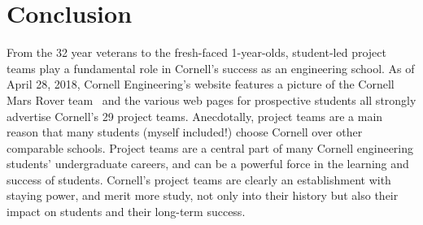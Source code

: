 \documentclass[12pt]{article}
\begin{document}
\section{Conclusion}
\label{sec:conclusion}

From the 32 year veterans to the fresh-faced 1-year-olds, student-led project teams play a fundamental role in Cornell's success as an engineering school.
As of April 28, 2018, Cornell Engineering's website features a picture of the Cornell Mars Rover team~\cite{fleischman_rovers_2018} and the various web pages for prospective students all strongly advertise Cornell's 29 project teams.
Anecdotally, project teams are a main reason that many students (myself included!) choose Cornell over other comparable schools.
Project teams are a central part of many Cornell engineering students' undergraduate careers, and can be a powerful force in the learning and success of students.
Cornell's project teams are clearly an establishment with staying power, and merit more study, not only into their history but also their impact on students and their long-term success.

\singlespacing


\end{document}

